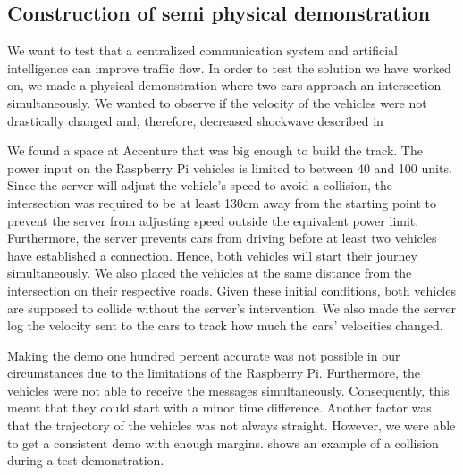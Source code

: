 \subsection{Construction of semi physical demonstration}\label{sec:demo}
We want to test that a centralized communication system and artificial intelligence can improve traffic flow. In order to test the solution we have worked on, we made a physical demonstration where two cars approach an intersection simultaneously. We wanted to observe if the velocity of the vehicles were not drastically changed and, therefore, decreased shockwave described in 

We found a space at Accenture that was big enough to build the track. The power input on the Raspberry Pi vehicles is limited to between 40 and 100 units. Since the server will adjust the vehicle's speed to avoid a collision, the intersection was required to be at least 130cm away from the starting point to prevent the server from adjusting speed outside the equivalent power limit. Furthermore, the server prevents cars from driving before at least two vehicles have established a connection. Hence, both vehicles will start their journey simultaneously. We also placed the vehicles at the same distance from the intersection on their respective roads. Given these initial conditions, both vehicles are supposed to collide without the server's intervention. We also made the server log the velocity sent to the cars to track how much the cars' velocities changed.

Making the demo one hundred percent accurate was not possible in our circumstances due to the limitations of the Raspberry Pi. Furthermore, the vehicles were not able to receive the messages simultaneously. Consequently, this meant that they could start with a minor time difference. Another factor was that the trajectory of the vehicles was not always straight. However, we were able to get a consistent demo with enough margins.  shows an example of a collision during a test demonstration.

